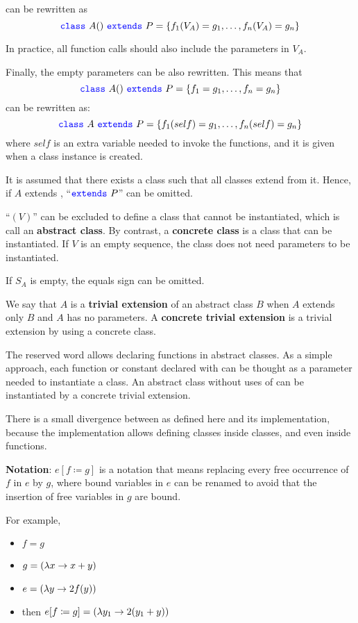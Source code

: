 can be rewritten as
\[\sclass\ A() \ \sextends\ P = \{
f_{1}(V_{A}) = g_{1},
\ldots ,
f_{n}(V_{A}) = g_{n}
\}
\]

In practice, all function calls should also include the parameters in $V_{A}$.

Finally, the empty parameters can be also rewritten.
This means that
\[{\color{blue}\texttt{{class}}}\ A() \ {\color{blue}\texttt{{extends}}}\ P = \{
f_{1} = g_{1},
\ldots ,
f_{n} = g_{n}
\}
\]
can be rewritten as:
\[{\color{blue}\texttt{{class}}}\ A \ {\color{blue}\texttt{{extends}}}\ P = \{
f_{1}(self) = g_{1},
\ldots ,
f_{n}(self) = g_{n}
\}
\]
where $self$ is an extra variable needed to invoke the functions, and it is given when a class instance is created.

It is assumed that there exists a class  such that all classes extend from it.
Hence, if $A$ extends , ``${\color{blue}\texttt{{extends}}}\ P$'' can be omitted.

``$(V)$'' can be excluded to define a class that cannot be instantiated, which is call an \textbf{abstract class}.
By contrast, a \textbf{concrete class} is a class that can be instantiated.
If $V$ is an empty sequence, the class does not need parameters to be instantiated.

If $S_{A}$ is empty, the equals sign can be omitted.

We say that $A$ is a \textbf{trivial extension} of an abstract class $B$ when $A$ extends only $B$ and $A$ has no parameters.
A \textbf{concrete trivial extension} is a trivial extension by using a concrete class.

The \shas reserved word allows declaring functions in abstract classes.
As a simple approach, each function or constant declared with \shas can be thought as a parameter needed to instantiate a class.
An abstract class without uses of \shas can be instantiated by a concrete trivial extension.

There is a small divergence between \Soda as defined here and its implementation, because the implementation allows defining classes inside classes, and even inside functions.

\textbf{Notation}: $e[f \coloneqq g]$ is a notation that means replacing every free occurrence of $f$ in $e$ by $g$, where bound variables in $e$ can be renamed to avoid that the insertion of free variables in $g$ are bound.

For example,
\begin{itemize}
    \item $f = g$
    \item $g = (\lambda {x} \to {x + y})$
    \item $e = (\lambda {y} \to {2 f(y)})$
    \item then $e[f \coloneqq g] = (\lambda {y_{1}} \to {2 (y_{1} + y)})$
\end{itemize}

